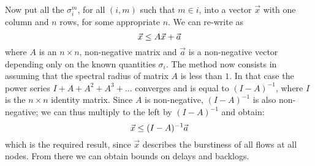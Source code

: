 Now put all the $\sigma_i^m$, for all $(i,m)$ such that $m \in i$,
into a vector $\vec{x}$ with one column and $n$ rows, for some
appropriate $n$. We can re-write  as
\begin{equation}\mylabel{eq-ds-lin2}
\vec{x} \leq A \vec{x} + \vec{a}
\end{equation}
where $A$ is an $n \times n$, non-negative matrix and $\vec{a}$ is
a non-negative vector depending only on the known quantities
$\sigma_i$. The method now consists in assuming that the spectral
radius of matrix $A$ is less than $1$. In that case the power
series $I + A + A^2 + A^3 + ...$ converges and is equal to
$(I-A)^{-1}$, where $I$ is the $n \times n$ identity matrix. Since
$A$ is non-negative, $(I-A)^{-1}$ is also non-negative; we can
thus multiply  to the left by $(I-A)^{-1}$ and
obtain:
\begin{equation}\mylabel{eq-ds-lin3}
\vec{x} \leq (I-A)^{-1} \vec{a}
\end{equation}
which is the required result, since $\vec{x}$ describes the
burstiness of all flows at all nodes. From there we can obtain
bounds on delays and backlogs.


